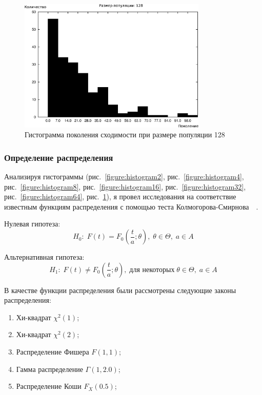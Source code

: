 \begin{figure}[h!]
\centering
\includegraphics[width=0.8\textwidth]{science/histogram128}
\caption{Гистограмма поколения сходимости при размере популяции 128}
\label{figure:histogram128}
\end{figure}

\clearpage
\subsubsection{Определение распределения}

Анализируя гистограммы (рис.~\ref{figure:histogram2}, рис.~\ref{figure:histogram4}, рис.~\ref{figure:histogram8}, рис.~\ref{figure:histogram16}, рис.~\ref{figure:histogram32}, рис.~\ref{figure:histogram64}, рис.~\ref{figure:histogram128}), я провел исследования на соответствие известным функциям распределения с помощью теста Колмогорова-Смирнова~\cite{KolmogorovSmirnov}~\cite{BlueStatistics}.

Нулевая гипотеза:
\begin{equation}
\label{equation:distrHyp0}
H_0: \; F(t) = F_0(\frac{t}{a};\theta), \; \theta \in \Theta, \; a \in A
\end{equation}

Альтернативная гипотеза:
\begin{equation}
\label{equation:distrHyp1}
H_1: \; F(t) \neq F_0(\frac{t}{a};\theta), \; \text{для некоторых} \; \theta \in \Theta, \; a \in A
\end{equation}

В качестве функции распределения были рассмотрены следующие законы распределения:
\begin{enumerate}
\item Хи-квадрат $\chi^2(1)$;
\item Хи-квадрат $\chi^2(2)$;
\item Распределение Фишера $F(1, 1)$;
\item Гамма распределение $\Gamma(1, 2.0)$;
\item Распределение Коши $F_X(0.5)$;
\end{enumerate}

